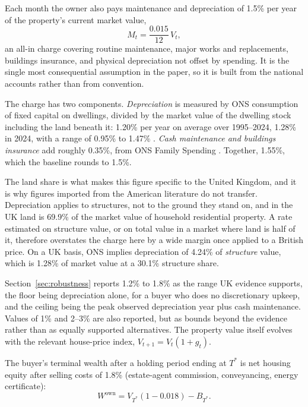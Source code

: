 Each month the owner also pays maintenance and depreciation of 1.5\% per year of the property's current market value,
\begin{equation}
  M_t = \frac{0.015}{12}\, V_t,
  \label{eq:maintenance}
\end{equation}
an all-in charge covering routine maintenance, major works and replacements, buildings insurance, and physical depreciation not offset by spending. It is the single most consequential assumption in the paper, so it is built from the national accounts rather than from convention.

The charge has two components. \emph{Depreciation} is measured by ONS consumption of fixed capital on dwellings, divided by the market value of the dwelling stock including the land beneath it: 1.20\% per year on average over 1995--2024, 1.28\% in 2024, with a range of 0.95\% to 1.47\% \parencite{ons_cfc,ons_balance_sheet}. \emph{Cash maintenance and buildings insurance} add roughly 0.35\%, from ONS Family Spending \parencite{ons_family_spending}. Together, 1.55\%, which the baseline rounds to 1.5\%.

The land share is what makes this figure specific to the United Kingdom, and it is why figures imported from the American literature do not transfer. Depreciation applies to structures, not to the ground they stand on, and in the UK land is 69.9\% of the market value of household residential property. A rate estimated on structure value, or on total value in a market where land is half of it, therefore overstates the charge here by a wide margin once applied to a British price. On a UK basis, ONS implies depreciation of 4.24\% of \emph{structure} value, which is 1.28\% of market value at a 30.1\% structure share.

Section~\ref{sec:robustness} reports 1.2\% to 1.8\% as the range UK evidence supports, the floor being depreciation alone, for a buyer who does no discretionary upkeep, and the ceiling being the peak observed depreciation year plus cash maintenance. Values of 1\% and 2--3\% are also reported, but as bounds beyond the evidence rather than as equally supported alternatives. The property value itself evolves with the relevant house-price index, $V_{t+1} = V_t (1 + g_t)$.

The buyer's terminal wealth after a holding period ending at $T^{*}$ is net housing equity after selling costs of 1.8\% (estate-agent commission, conveyancing, energy certificate):
\begin{equation}
  W^{\text{own}} = V_{T^{*}} (1 - 0.018) - B_{T^{*}}.
  \label{eq:nw_buy}
\end{equation}

